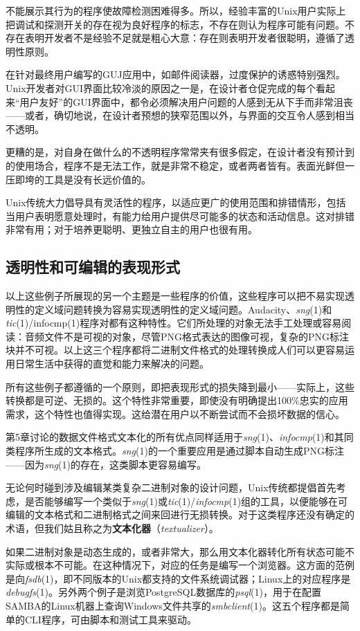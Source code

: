 \documentclass[12pt,oneside]{book}
\begin{document}
\begin{common-format}
不能展示其行为的程序使故障检测困难得多。所以，经验丰富的Unix用户实际上把调试和探测开关的存在视为良好程序的标志，不存在则认为程序可能有问题。不存在表明开发者不是经验不足就是粗心大意：存在则表明开发者很聪明，遵循了透明性原则。

在针对最终用户编写的GUJ应用中，如邮件阅读器，过度保护的诱惑特别强烈。Unix开发者对GUI界面比较冷淡的原因之一是，在设计者仓促完成的每个看起来“用户友好”的GUI界面中，都令必须解决用户问题的人感到无从下手而非常沮丧——或者，确切地说，在设计者预想的狭窄范围以外，与界面的交互令人感到相当不透明。

更糟的是，对自身在做什么的不透明程序常常夹有很多假定，在设计者没有预计到的使用场合，程序不是无法工作，就是非常不稳定，或者两者皆有。表面光鲜但一压即垮的工具是没有长远价值的。

Unix传统大力倡导具有灵活性的程序，以适应更广的使用范围和排错情形，包括当用户表明愿意处理时，有能力给用户提供尽可能多的状态和活动信息。这对排错非常有用；对于培养更聪明、更独立自主的用户也很有用。

\subsection{透明性和可编辑的表现形式}
以上这些例子所展现的另一个主题是一些程序的价值，这些程序可以把不易实现透明性的定义域问题转换为容易实现透明性的定义域问题。Audacity、\textit{sng}(1)和\textit{tic}(1)/infocmp(1)程序对都有这种特性。它们所处理的对象无法手工处理或容易阅读：音频文件不是可视的对象，尽管PNG格式表达的图像可视，复杂的PNG标注块并不可视。以上这三个程序都将二进制文件格式的处理转换成人们可以更容易运用日常生活中获得的直觉和能力来解决的问题。

所有这些例子都遵循的一个原则，即把表现形式的损失降到最小——实际上，这些转换都是可逆、无损的。这个特性非常重要，即使没有明确提出100\%{}忠实的应用需求，这个特性也值得实现。这给潜在用户以不断尝试而不会损坏数据的信心。

第5章讨论的数据文件格式文本化的所有优点同样适用于\textit{sng}(1)、\textit{infocmp}(1)和其同类程序所生成的文本格式。\textit{sng}(1)的一个重要应用是通过脚本自动生成PNG标注——因为\textit{sng}(1)的存在，这类脚本更容易编写。

无论何时碰到涉及编辑某类复杂二进制对象的设计问题，Unix传统都提倡首先考虑，是否能够编写一个类似于\textit{sng}(1)或\textit{tic}(1)/\textit{infocmp}(1)组的工具，以便能够在可编辑的文本格式和二进制格式之间来回进行无损转换。对于这类程序还没有确定的术语，但我们姑且称之为\textbf{文本化器}（\textit{textualizer}）。

如果二进制对象是动态生成的，或者非常大，那么用文本化器转化所有状态可能不实际或根本不可能。在这种情况下，对应的任务是编写一个浏览器。这方面的范例是向\textit{fsdb}(1)，即不同版本的Unix都支持的文件系统调试器；Linux上的对应程序是\textit{debugfs}(1)。另外两个例子是浏览PostgreSQL数据库的\textit{psql}(1)，用于在配置SAMBA的Linux机器上查询Windows文件共享的\textit{smbclient}(1)。这五个程序都是简单的CLI程序，可由脚本和测试工具来驱动。


\end{common-format}
\end{document}
